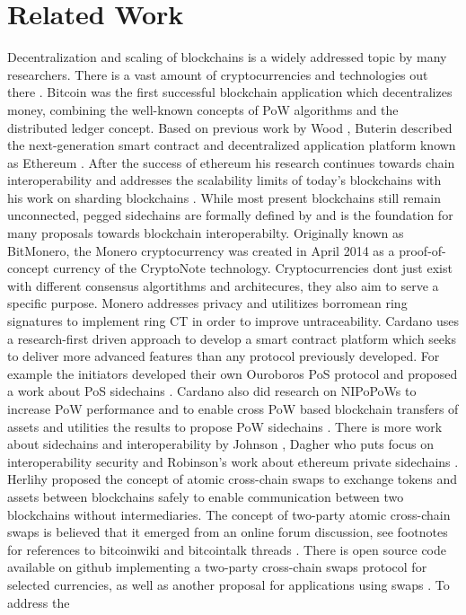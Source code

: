\section{Related Work}
\label{sec:intro:relatedwork}
Decentralization and scaling of blockchains is a widely addressed topic by many researchers. There is a vast amount of cryptocurrencies and technologies out there \cite{coinmarketcap}. Bitcoin \cite{nakamoto2008peer} was the first successful blockchain application which decentralizes money, combining the well-known concepts of \ac{PoW} algorithms and the distributed ledger concept. Based on previous work by Wood \cite{wood2014ethereum}, Buterin described the next-generation smart contract and decentralized application platform known as Ethereum \cite{buterin2013ethereum} \cite{buterin2014ethereum}. After the success of ethereum his research continues towards chain interoperability \cite{buterin2016chain} and addresses the scalability limits of today's blockchains with his work on sharding blockchains \cite{buterin2017sharding}. While most present blockchains still remain unconnected, pegged sidechains are formally defined by \cite{back2014enabling} and is the foundation for many proposals towards blockchain interoperabilty. Originally known as BitMonero, the Monero cryptocurrency was created in April 2014 \cite{alonso2020zero} as a proof-of-concept currency of the CryptoNote \cite{van2013cryptonote} technology. Cryptocurrencies dont just exist with different consensus algortithms and architecures, they also aim to serve a specific purpose. Monero addresses privacy and utilitizes borromean ring signatures \cite{maxwell2015borromean} to implement ring \ac{CT} \cite{noether2016ring} in order to improve untraceability. Cardano uses a research-first driven approach to develop a smart contract platform which seeks to deliver more advanced features than any protocol previously developed. For example the initiators developed their own Ouroboros \ac{PoS} protocol \cite{kiayias2017ouroboros} and proposed a work about \ac{PoS} sidechains \cite{gavzi2019proof}. Cardano also did research on \ac{NIPoPoWs} to increase \ac{PoW} performance and to enable cross \ac{PoW} based blockchain transfers of assets \cite{kiayias2017non} and utilities the results to propose \ac{PoW} sidechains \cite{kiayias2019proof}. There is more work about sidechains and interoperability by Johnson \cite{johnson2019sidechains}, Dagher who puts focus on interoperability security \cite{dagher2017towards} and Robinson's work about ethereum private sidechains \cite{robinson2019atomic}. Herlihy proposed the concept of atomic cross-chain swaps to exchange tokens and assets between blockchains safely \cite{herlihy2018atomic} to enable communication between two blockchains without intermediaries. The concept of two-party atomic cross-chain swaps is believed that it emerged from an online forum discussion, see footnotes for references to bitcoinwiki and bitcointalk threads \cite{atomictrading} \cite{cutandchoose}. There is open source code available on github \cite{hashedtimelocked} \cite{dered} implementing a two-party cross-chain swaps protocol for selected currencies, as well as another proposal for applications using swaps \cite{zyskind2018enigma}. To address the 